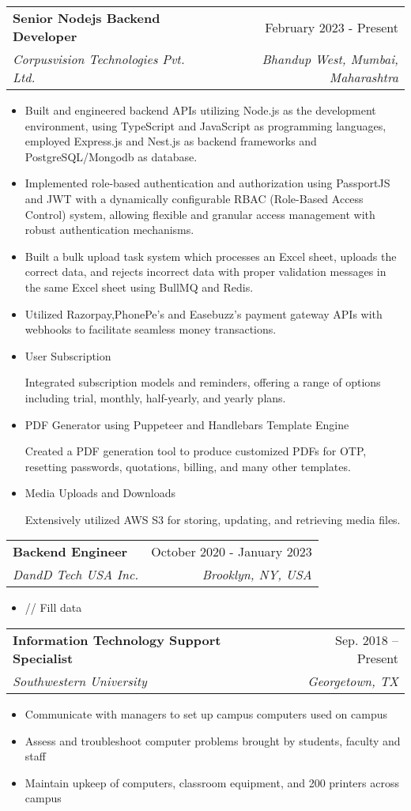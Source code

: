 \documentclass[letterpaper,11pt]{article}
\makeatletter
\newcommand{\resumeItem}[1]{
  \item\small{
    {#1 \vspace{-2pt}}
  }
}
\newcommand{\resumeSubheading}[4]{
  \vspace{-2pt}\item
    \begin{tabular*}{0.97\textwidth}[t]{l@{\extracolsep{\fill}}r}
      \textbf{#1} & #2 \\
      \textit{\small#3} & \textit{\small #4} \\
    \end{tabular*}\vspace{-7pt}
}
\newcommand{\resumeSubSubheading}[2]{
    \item
    \begin{tabular*}{0.97\textwidth}{l@{\extracolsep{\fill}}r}
      \textit{\small#1} & \textit{\small #2} \\
    \end{tabular*}\vspace{-7pt}
}
\newcommand{\resumeSubHeadingListEnd}{\end{itemize}}
\newcommand{\resumeItemListStart}{\begin{itemize}}
\newcommand{\resumeItemListEnd}{\end{itemize}\vspace{-5pt}}
\makeatother
\begin{document}
    \resumeSubheading
      {Senior Nodejs Backend Developer}{February 2023 - Present}
      {Corpusvision Technologies Pvt. Ltd.}{Bhandup West, Mumbai, Maharashtra}
      \resumeItemListStart
        \resumeItem{Built and engineered backend APIs utilizing Node.js as the development environment, using TypeScript and JavaScript as programming languages, employed Express.js and Nest.js as backend frameworks and PostgreSQL/Mongodb as database.
       }
        \resumeItem{Implemented role-based authentication and authorization using PassportJS and JWT with a dynamically configurable RBAC (Role-Based Access Control) system, allowing flexible and granular access management with robust authentication mechanisms.}
        \resumeItem{Built a bulk upload task system which processes an Excel sheet, uploads the correct data, and rejects incorrect data with proper validation messages in the same Excel sheet using BullMQ and Redis.}
        \resumeItem{Utilized Razorpay,PhonePe's and Easebuzz's payment gateway APIs with webhooks to facilitate seamless money transactions.}
        \resumeItem{User Subscription}
        {Integrated subscription models and reminders, offering a range of options including trial, monthly, half-yearly, and yearly plans.}
        \resumeItem{PDF Generator using Puppeteer and Handlebars Template Engine}
        {Created a PDF generation tool to produce customized PDFs for OTP, resetting passwords, quotations, billing, and many other templates.}
        \resumeItem{Media Uploads and Downloads}
        {Extensively utilized AWS S3 for storing, updating, and retrieving media files.}
      \resumeItemListEnd

      \resumeSubheading
      {Backend Engineer}{October 2020 - January 2023}
      {DandD Tech USA Inc.}{Brooklyn, NY, USA}
      \resumeItemListStart
        \resumeItem{// Fill data}
      \resumeItemListEnd


    \resumeSubheading
      {Information Technology Support Specialist}{Sep. 2018 -- Present}
      {Southwestern University}{Georgetown, TX}
      \resumeItemListStart
        \resumeItem{Communicate with managers to set up campus computers used on campus}
        \resumeItem{Assess and troubleshoot computer problems brought by students, faculty and staff}
        \resumeItem{Maintain upkeep of computers, classroom equipment, and 200 printers across campus}
    \resumeItemListEnd
\end{document}
